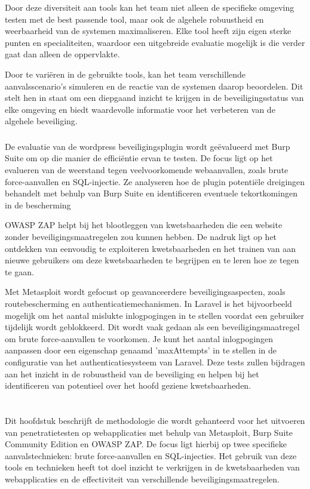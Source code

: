 Door deze diversiteit aan tools kan het team niet alleen de specifieke omgeving testen met de best passende tool, maar ook de algehele robuustheid en 
weerbaarheid van de systemen maximaliseren. Elke tool heeft zijn eigen sterke punten en specialiteiten, waardoor een uitgebreide evaluatie mogelijk 
is die verder gaat dan alleen de oppervlakte.

Door te variëren in de gebruikte tools, kan het team verschillende aanvalsscenario's simuleren en de reactie van de systemen daarop beoordelen. Dit 
stelt hen in staat om een diepgaand inzicht te krijgen in de beveiligingsstatus van elke omgeving en biedt waardevolle informatie voor het verbeteren 
van de algehele beveiliging.

\subsubsection{}
De evaluatie van de wordpress beveiligingsplugin wordt geëvalueerd met Burp Suite om op die manier de efficiëntie ervan te testen. De focus ligt op het evalueren van de weerstand 
tegen veelvoorkomende webaanvallen, zoals brute force-aanvallen en SQL-injectie. Ze analyseren hoe de plugin potentiële dreigingen behandelt met 
behulp van Burp Suite en identificeren eventuele tekortkomingen in de bescherming

OWASP ZAP helpt bij het blootleggen van kwetsbaarheden die een website zonder beveiligingsmaatregelen zou kunnen hebben. De nadruk ligt op het 
ontdekken van eenvoudig te exploiteren kwetsbaarheden en het trainen van aan nieuwe gebruikers om deze kwetsbaarheden te begrijpen en 
te leren hoe ze tegen te gaan.

Met Metasploit wordt gefocust op geavanceerdere beveiligingsaspecten, zoals routebescherming en authenticatiemechanismen.
In Laravel is het bijvoorbeeld mogelijk om het aantal mislukte inlogpogingen in te stellen voordat een gebruiker tijdelijk wordt geblokkeerd. Dit wordt vaak gedaan 
als een beveiligingsmaatregel om brute force-aanvallen te voorkomen. Je kunt het aantal inlogpogingen aanpassen door een eigenschap genaamd 
'maxAttempts' in te stellen in de configuratie van het authenticatiesysteem van Laravel. Deze tests zullen 
bijdragen aan het inzicht in de robuustheid van de beveiliging en helpen bij het identificeren van potentieel over het hoofd geziene kwetsbaarheden.

\section{}
Dit hoofdstuk beschrijft de methodologie die wordt gehanteerd voor het uitvoeren van penetratietesten op webapplicaties met behulp van Metasploit, 
Burp Suite Community Edition en OWASP ZAP. De focus ligt hierbij op twee specifieke aanvalstechnieken: brute force-aanvallen en SQL-injecties. 
Het gebruik van deze tools en technieken heeft tot doel inzicht te verkrijgen in de kwetsbaarheden van webapplicaties en de effectiviteit van 
verschillende beveiligingsmaatregelen.

